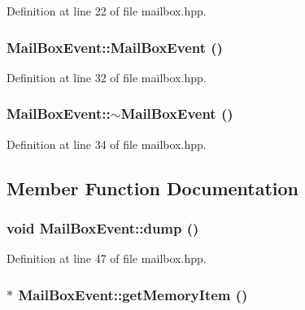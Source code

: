 Definition at line 22 of file mailbox.hpp.\hypertarget{struct_mail_box_event_abb298cbe0ee701d863fed2d0a9f59641}{
\subsubsection[{MailBoxEvent}]{\setlength{\rightskip}{0pt plus 5cm}MailBoxEvent::MailBoxEvent ()}}
\label{struct_mail_box_event_abb298cbe0ee701d863fed2d0a9f59641}


Definition at line 32 of file mailbox.hpp.\hypertarget{struct_mail_box_event_a15b0b506d91c8961389a9e922522da04}{
\subsubsection[{$\sim$MailBoxEvent}]{\setlength{\rightskip}{0pt plus 5cm}MailBoxEvent::$\sim$MailBoxEvent ()}}
\label{struct_mail_box_event_a15b0b506d91c8961389a9e922522da04}


Definition at line 34 of file mailbox.hpp.

\subsection{Member Function Documentation}
\hypertarget{struct_mail_box_event_a7ddaceefa5b710b8c28bf185c91b8b5e}{
\subsubsection[{dump}]{\setlength{\rightskip}{0pt plus 5cm}void MailBoxEvent::dump ()}}
\label{struct_mail_box_event_a7ddaceefa5b710b8c28bf185c91b8b5e}


Definition at line 47 of file mailbox.hpp.\hypertarget{struct_mail_box_event_a1b6dc78ff4c77136d16ff11871a2a2d8}{
\subsubsection[{getMemoryItem}]{$\ast$ MailBoxEvent::getMemoryItem ()}}
\label{struct_mail_box_event_a1b6dc78ff4c77136d16ff11871a2a2d8}



